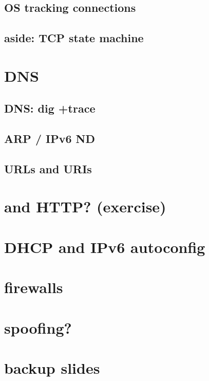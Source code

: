 \subsection{OS tracking connections}


\subsection{aside: TCP state machine}

\section{DNS}


\subsection{DNS: dig +trace}


\subsection{ARP / IPv6 ND}


\subsection{URLs and URIs}


\section{and HTTP? (exercise)}


\section{DHCP and IPv6 autoconfig}



\section{firewalls} %


\section{spoofing?}


\section{backup slides}

